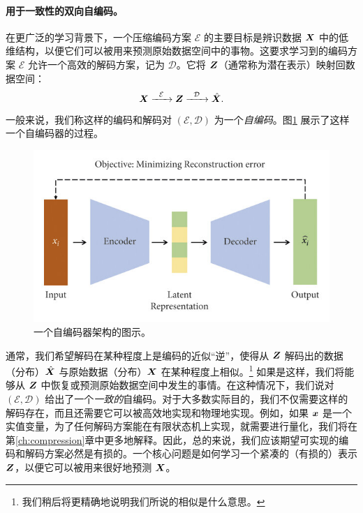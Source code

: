 \documentclass[../../book-main.tex]{subfiles}
\begin{document}
\paragraph{用于一致性的双向自编码。}
在更广泛的学习背景下，一个压缩编码方案 $\mathcal{E}$ 的主要目标是辨识数据 $\bm{X}$ 中的低维结构，以便它们可以被用来预测原始数据空间中的事物。这要求学习到的编码方案 $\mathcal{E}$ 允许一个高效的解码方案，记为 $\mathcal D$。它将 $\bm{Z}$（通常称为潜在表示）映射回数据空间：
\begin{equation}
    \bm{X}   \xrightarrow{\hspace{2mm} \mathcal{E}\hspace{2mm}} \bm{Z}  \xrightarrow{\hspace{2mm} \mathcal{D} \hspace{2mm}} \hat {\bm{X}}.
       \label{eqn:auto-encoding}
\end{equation}
一般来说，我们称这样的编码和解码对 $(\mathcal{E}, \mathcal{D})$ 为一个{\em 自编码}。图\ref{fig:autoencoder}
展示了这样一个自编码器的过程。
\begin{figure}
    \centering
    \includegraphics[width=0.7\linewidth]{figures/Autoencoder.jpg}
    \caption{一个自编码器架构的图示。}
    \label{fig:autoencoder}
\end{figure}


通常，我们希望解码在某种程度上是编码的近似“逆”，使得从 $\bm{Z}$ 解码出的数据（分布）$\hat {\bm{X}}$ 与原始数据（分布）$\bm{X}$ 在某种程度上相似。\footnote{我们稍后将更精确地说明我们所说的相似是什么意思。} 如果是这样，我们将能够从 $\bm{Z}$ 中恢复或预测原始数据空间中发生的事情。在这种情况下，我们说对 $(\mathcal{E}, \mathcal{D})$ 给出了一个{\em 一致的}自编码。对于大多数实际目的，我们不仅需要这样的解码存在，而且还需要它可以被高效地实现和物理地实现。例如，如果 $\bm{x}$ 是一个实值变量，为了任何解码方案能在有限状态机上实现，就需要进行量化，我们将在第\ref{ch:compression}章中更多地解释。因此，总的来说，我们应该期望可实现的编码和解码方案必然是有损的。一个核心问题是如何学习一个紧凑的（有损的）表示 $\bm{Z}$，以便它可以被用来很好地预测 $\bm{X}$。
\end{document}
